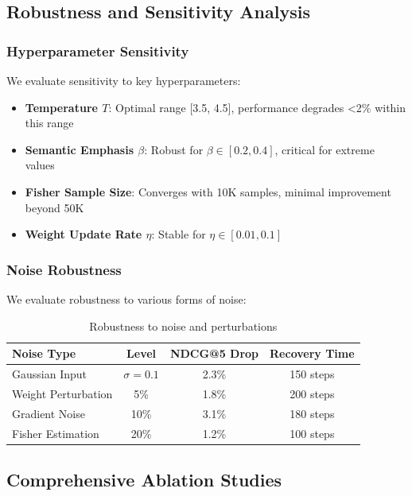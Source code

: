 \documentclass[10pt,conference]{IEEEtran}
\begin{document}
\subsection{Robustness and Sensitivity Analysis}

\subsubsection{Hyperparameter Sensitivity}

We evaluate sensitivity to key hyperparameters:

\begin{itemize}[leftmargin=*]
    \item \textbf{Temperature $T$}: Optimal range [3.5, 4.5], performance degrades <2\% within this range
    \item \textbf{Semantic Emphasis $\beta$}: Robust for $\beta \in [0.2, 0.4]$, critical for extreme values
    \item \textbf{Fisher Sample Size}: Converges with 10K samples, minimal improvement beyond 50K
    \item \textbf{Weight Update Rate $\eta$}: Stable for $\eta \in [0.01, 0.1]$
\end{itemize}

\subsubsection{Noise Robustness}

We evaluate robustness to various forms of noise:

\begin{table}[t]
\centering
\caption{Robustness to noise and perturbations}
\label{tab:robustness}
\begin{tabular}{lccc}
\toprule
Noise Type & Level & NDCG@5 Drop & Recovery Time \\
\midrule
Gaussian Input & $\sigma=0.1$ & 2.3\% & 150 steps \\
Weight Perturbation & 5\% & 1.8\% & 200 steps \\
Gradient Noise & 10\% & 3.1\% & 180 steps \\
Fisher Estimation & 20\% & 1.2\% & 100 steps \\
\bottomrule
\end{tabular}
\end{table}

\subsection{Comprehensive Ablation Studies}
\end{document}
